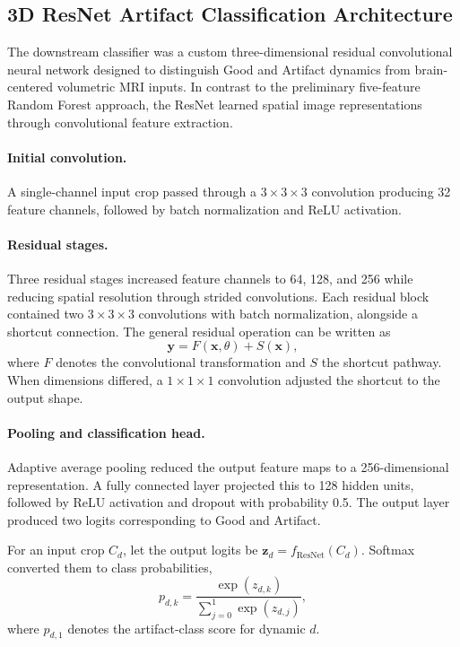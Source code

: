 \subsection{3D ResNet Artifact Classification Architecture}
\label{subsec:3d_resnet_architecture}

The downstream classifier was a custom three-dimensional residual convolutional neural network designed to distinguish Good and Artifact dynamics from brain-centered volumetric MRI inputs. In contrast to the preliminary five-feature Random Forest approach, the ResNet learned spatial image representations through convolutional feature extraction.

\paragraph{Initial convolution.}
A single-channel input crop passed through a $3\times3\times3$ convolution producing 32 feature channels, followed by batch normalization and ReLU activation.

\paragraph{Residual stages.}
Three residual stages increased feature channels to 64, 128, and 256 while reducing spatial resolution through strided convolutions. Each residual block contained two $3\times3\times3$ convolutions with batch normalization, alongside a shortcut connection. The general residual operation can be written as
\begin{equation}
\mathbf{y}=F(\mathbf{x},\theta)+S(\mathbf{x}),
\end{equation}
where $F$ denotes the convolutional transformation and $S$ the shortcut pathway. When dimensions differed, a $1\times1\times1$ convolution adjusted the shortcut to the output shape.

\paragraph{Pooling and classification head.}
Adaptive average pooling reduced the output feature maps to a 256-dimensional representation. A fully connected layer projected this to 128 hidden units, followed by ReLU activation and dropout with probability 0.5. The output layer produced two logits corresponding to Good and Artifact.

For an input crop $C_d$, let the output logits be $\mathbf{z}_d=f_{\mathrm{ResNet}}(C_d)$. Softmax converted them to class probabilities,
\begin{equation}
p_{d,k}=\frac{\exp(z_{d,k})}{\sum_{j=0}^{1}\exp(z_{d,j})},
\end{equation}
where $p_{d,1}$ denotes the artifact-class score for dynamic $d$.

